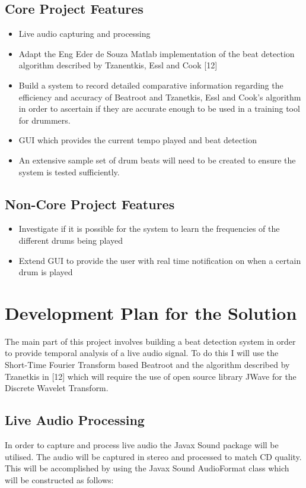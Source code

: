 \documentclass[a4paper, 11pt]{article}
\begin{document}
\subsection{Core Project Features}
\begin{itemize}
\item Live audio capturing and processing
\item Adapt the Eng Eder de Souza Matlab implementation of the beat detection algorithm described by Tzanentkis, Essl and Cook [12] 
\item Build a system to record detailed comparative information regarding the efficiency and accuracy of Beatroot and Tzanetkis, Essl and Cook's algorithm in order to ascertain if they are accurate enough to be used in a training tool for drummers.
\item GUI which provides the current tempo played and beat detection
\item An extensive sample set of drum beats will need to be created to ensure the system is tested sufficiently.
\end{itemize}

\subsection{Non-Core Project Features}
\begin{itemize}
\item Investigate if it is possible for the system to learn the frequencies of the different drums being played
\item Extend GUI to provide the user with real time notification on when a certain drum is played
\end{itemize}

\maketitle{} 
\section{Development Plan for the Solution}

The main part of this project involves building a beat detection system in order to provide temporal analysis of a live audio signal. To do this I will use the Short-Time Fourier Transform based Beatroot and the algorithm described by Tzanetkis in [12] which will require the use of open source library JWave for the Discrete Wavelet Transform. 

\subsection{Live Audio Processing}
In order to capture and process live audio the Javax Sound package will be utilised. The audio will be captured in stereo and processed to match CD quality. This will be accomplished by using the Javax Sound AudioFormat class which will be constructed as follows:
\end{document}
